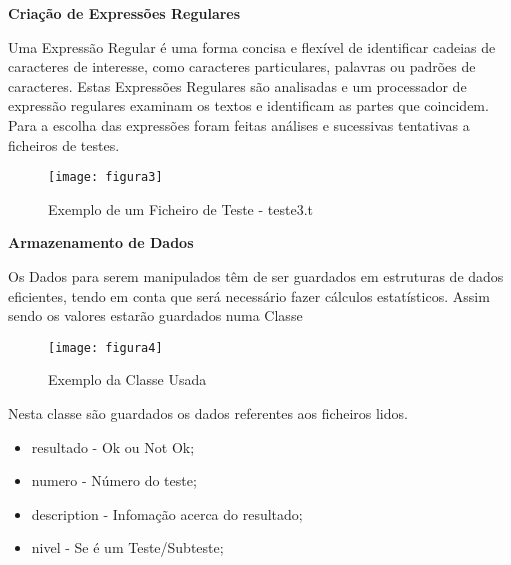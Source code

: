 \documentclass{article}
\begin{document}
\centerline{\textbf{Criação de Expressões Regulares}}

\vspace{3 em}

Uma Expressão Regular é uma forma concisa e flexível de identificar cadeias de caracteres de interesse, como caracteres particulares, palavras ou padrões de caracteres. Estas Expressões Regulares são analisadas e um processador de expressão regulares examinam os textos e identificam as partes que coincidem. \\

\vspace{1,5 em}
Para a escolha das expressões foram feitas análises e sucessivas tentativas a ficheiros de testes. \\

\begin{figure}[!htb]
	\centering
	\texttt{[image: figura3]}
	\caption{Exemplo de um Ficheiro de Teste - teste3.t}
\end{figure}

\vspace{3 em}


\newpage
\centerline{\textbf{Armazenamento de Dados}}

\vspace{3 em}

Os Dados para serem manipulados têm de ser guardados em estruturas de dados eficientes, tendo em conta que será necessário fazer cálculos estatísticos. Assim sendo os valores estarão guardados numa Classe  \\

\vspace{1,5 em}
\begin{figure}[!htb]
	\centering
	\texttt{[image: figura4]}
	\caption{Exemplo da Classe Usada}
\end{figure}

\vspace{3 em}
Nesta classe são guardados os dados referentes aos ficheiros lidos.

\vspace{2 em}
\begin{itemize}
	\item resultado - Ok ou Not Ok;
	\item numero - Número do teste;
	\item description - Infomação acerca do resultado;
	\item nivel - Se é um Teste/Subteste;
\end{itemize}
\end{document}
